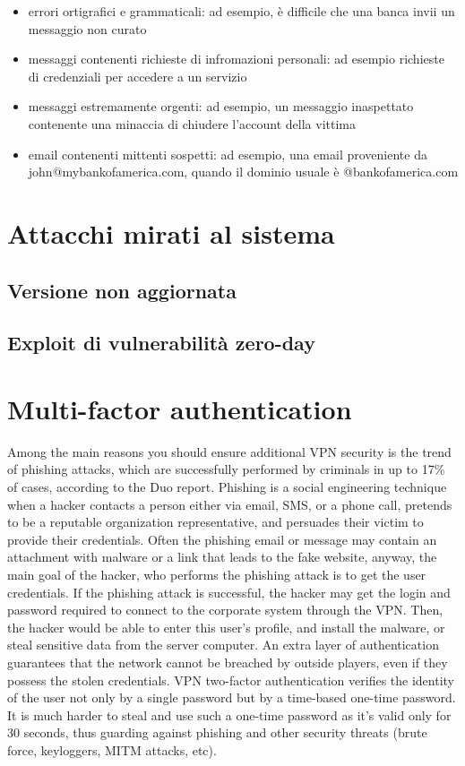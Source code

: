 \begin{itemize}
    \item errori ortigrafici e grammaticali: ad esempio, è difficile che una banca invii un messaggio non curato
    \item messaggi contenenti richieste di infromazioni personali: ad esempio richieste di credenziali per accedere a un servizio
    \item messaggi estremamente orgenti: ad esempio, un messaggio inaspettato contenente una minaccia di chiudere l'account della vittima
    \item email contenenti mittenti sospetti: ad esempio, una email proveniente da john@mybankofamerica.com, quando il dominio usuale è @bankofamerica.com
\end{itemize}

\section{Attacchi mirati al sistema}
\subsection{Versione non aggiornata}
\subsection{Exploit di vulnerabilità zero-day}

\section{Multi-factor authentication}
Among the main reasons you should ensure additional VPN security is the trend of phishing attacks, which are successfully performed by criminals in up to 17\% of cases, according to the Duo report.
Phishing is a  social engineering technique when a hacker contacts a person either via email, SMS, or a phone call, pretends to be a reputable organization representative, and persuades their victim to provide their credentials. Often the phishing email or message may contain an attachment with malware or a link that leads to the fake website, anyway, the main goal of the hacker, who performs the phishing attack is to get the user credentials.
If the phishing attack is successful, the hacker may get the login and password required to connect to the corporate system through the VPN. Then, the hacker would be able to enter this user's profile, and install the malware, or steal sensitive data from the server computer.
An extra layer of authentication guarantees that the network cannot be breached by outside players, even if they possess the stolen credentials. VPN two-factor authentication verifies the identity of the user not only by a single password but by a time-based one-time password. It is much harder to steal and use such a one-time password as it's valid only for 30 seconds, thus guarding against phishing and other security threats (brute force, keyloggers, MITM attacks, etc).

